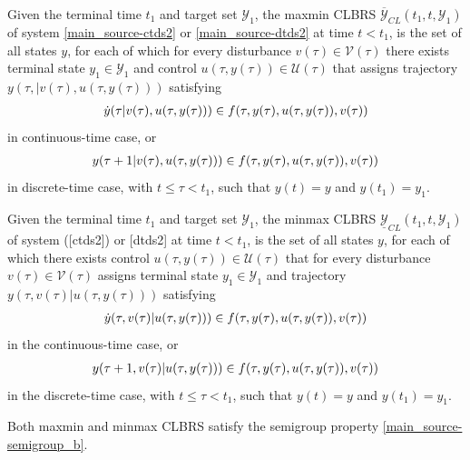 \documentclass[letterpaper,10pt,english]{sphinxmanual}
\begin{document}
Given the terminal time $t_1$ and
target set ${\mathcal Y}_1$, the maxmin CLBRS
$\overline{{\mathcal Y}}_{CL}(t_1, t, {\mathcal Y}_1)$ of system
\eqref{main_source-ctds2} or \eqref{main_source-dtds2} at time $t<t_1$, is the set of all states
$y$, for each of which for every disturbance
$v(\tau)\in{\mathcal V}(\tau)$ there exists terminal state
$y_1\in{\mathcal Y}_1$ and control
$u(\tau, y(\tau))\in{\mathcal U}(\tau)$ that assigns trajectory
$y(\tau, | v(\tau), u(\tau, y(\tau)))$ satisfying
\begin{gather}
\begin{split}\dot{y}(\tau | v(\tau), u(\tau, y(\tau))) \in
f(\tau, y(\tau), u(\tau, y(\tau)), v(\tau))\end{split}\notag
\end{gather}
in continuous-time case, or
\begin{gather}
\begin{split}y(\tau+1 | v(\tau), u(\tau, y(\tau))) \in
f(\tau, y(\tau), u(\tau, y(\tau)), v(\tau))\end{split}\notag
\end{gather}
in discrete-time case, with $t\leqslant\tau<t_1$, such that
$y(t) = y$ and $y(t_1)=y_1$.

Given the terminal time $t_1$ and target set ${\mathcal Y}_1$, the
minmax CLBRS $\underline{{\mathcal Y}}_{CL}(t_1, t, {\mathcal Y}_1)$ of system
({[}ctds2{]}) or {[}dtds2{]} at time $t<t_1$, is the set of all states
$y$, for each of which there exists control
$u(\tau, y(\tau))\in{\mathcal U}(\tau)$ that for every disturbance
$v(\tau)\in{\mathcal V}(\tau)$ assigns terminal state
$y_1\in{\mathcal Y}_1$ and trajectory
$y(\tau, v(\tau) | u(\tau, y(\tau)))$ satisfying
\begin{gather}
\begin{split}\dot{y}(\tau, v(\tau) | u(\tau, y(\tau))) \in
f(\tau, y(\tau), u(\tau, y(\tau)), v(\tau))\end{split}\notag
\end{gather}
in the continuous-time case, or
\begin{gather}
\begin{split}y(\tau+1, v(\tau) | u(\tau, y(\tau))) \in
f(\tau, y(\tau), u(\tau, y(\tau)), v(\tau))\end{split}\notag
\end{gather}
in the discrete-time case, with $t\leqslant\tau<t_1$, such that
$y(t) = y$ and $y(t_1)=y_1$.

Both
maxmin and minmax CLBRS satisfy the semigroup property
\eqref{main_source-semigroup_b}.
\end{document}
